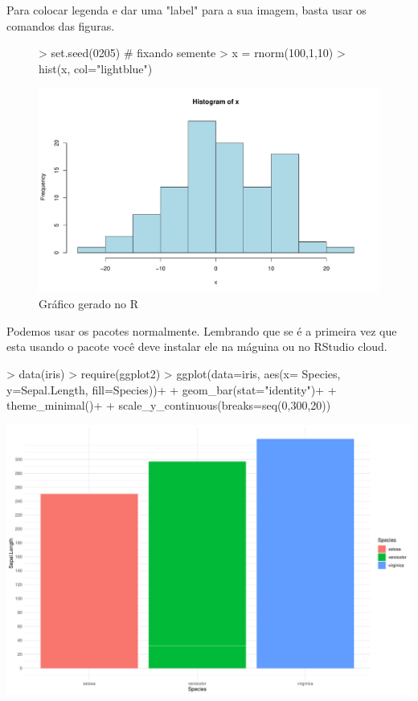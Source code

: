 \documentclass[12pt,a4paper]{article}
\begin{document}
Para colocar legenda e dar uma "label" para a sua imagem, basta usar os comandos das figuras. 

\begin{figure}[!h]
\centering

\begin{Schunk}
\begin{Sinput}
> set.seed(0205) # fixando semente
> x = rnorm(100,1,10)
> hist(x, col="lightblue")
\end{Sinput}
\end{Schunk}
\includegraphics{page-005}

\caption{Gráfico gerado no R}
\label{fig:graf}
\end{figure}

Podemos usar os pacotes normalmente. Lembrando que se é a primeira vez que esta usando o pacote você deve instalar ele na máguina ou no RStudio cloud.

\begin{Schunk}
\begin{Sinput}
> data(iris)
> require(ggplot2)
> ggplot(data=iris, aes(x= Species, y=Sepal.Length, fill=Species))+
+   geom_bar(stat="identity")+
+   theme_minimal()+
+   scale_y_continuous(breaks=seq(0,300,20))
\end{Sinput}
\end{Schunk}
\includegraphics{page-006}
\end{document}
